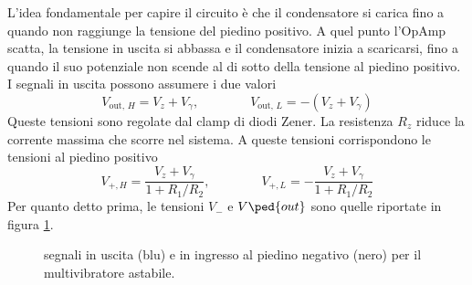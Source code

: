 \documentclass[a4paper, 11pt]{article}
\begin{document}
	L'idea fondamentale per capire il circuito è che il condensatore si carica fino a quando non raggiunge la tensione del piedino positivo. A quel punto l'OpAmp scatta, la tensione in uscita si abbassa e il condensatore inizia a scaricarsi, fino a quando il suo potenziale non scende al di sotto della tensione al piedino positivo. I segnali in uscita possono assumere i due valori
	\[V_{\text{out},\,H}=V_z+V_\gamma,\qquad\qquad V_{\text{out},\,L}=-(V_z+V_\gamma)\]
	Queste tensioni sono regolate dal clamp di diodi Zener. La resistenza $R_z$ riduce la corrente massima che scorre nel sistema. A queste tensioni corrispondono le tensioni al piedino positivo
	\[V_{+,H}=\frac{V_z+V_\gamma}{1+R_1/R_2},\qquad\qquad V_{+,L}=-\frac{V_z+V_\gamma}{1+R_1/R_2}\]
	Per quanto detto prima, le tensioni $V_-$ e $V\ped{out}$ sono quelle riportate in figura \ref{fig:multivibastabtempo}.
	\begin{figure}[h!]
		\centering
		\caption{segnali in uscita (blu) e in ingresso al piedino negativo (nero) per il multivibratore astabile.}
		\label{fig:multivibastabtempo}
	\end{figure}
	
\end{document}
